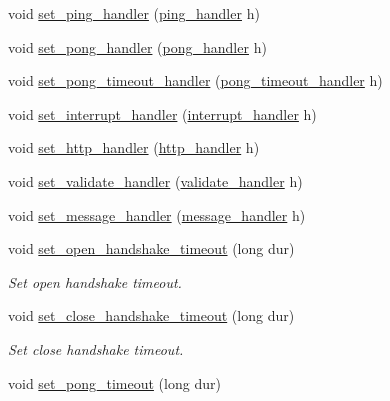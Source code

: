 \begin{DoxyCompactItemize}
\item 
void \hyperlink{classwebsocketpp_1_1endpoint_adc6caf0164a0cd073f0535078ccac123}{set\+\_\+ping\+\_\+handler} (\hyperlink{namespacewebsocketpp_a9dcaaa7370865f1bcacb55ae715793ef}{ping\+\_\+handler} h)
\item 
void \hyperlink{classwebsocketpp_1_1endpoint_a8ab51c3878bbbcfc92cf5ed6af65e8d7}{set\+\_\+pong\+\_\+handler} (\hyperlink{namespacewebsocketpp_a1798d54e6d98a481cf870091af84bc1f}{pong\+\_\+handler} h)
\item 
void \hyperlink{classwebsocketpp_1_1endpoint_a02f6288d1e7c32de7a5940a337076917}{set\+\_\+pong\+\_\+timeout\+\_\+handler} (\hyperlink{namespacewebsocketpp_a2c5925a111b9e553efebea35d5ea155f}{pong\+\_\+timeout\+\_\+handler} h)
\item 
void \hyperlink{classwebsocketpp_1_1endpoint_a026eb37f85cea8e79f1a007d12bb55dd}{set\+\_\+interrupt\+\_\+handler} (\hyperlink{namespacewebsocketpp_a55f6947df7673a9de3c44b6bd5d4a82a}{interrupt\+\_\+handler} h)
\item 
void \hyperlink{classwebsocketpp_1_1endpoint_a511874384b71238b042968cf736bc510}{set\+\_\+http\+\_\+handler} (\hyperlink{namespacewebsocketpp_a37bc4d5b3b21d3bb494d8a23236315d2}{http\+\_\+handler} h)
\item 
void \hyperlink{classwebsocketpp_1_1endpoint_ac5d059736dd862ccfb3582ba310dfae7}{set\+\_\+validate\+\_\+handler} (\hyperlink{namespacewebsocketpp_ae28f3fed86a59b1998746694f3d4edbd}{validate\+\_\+handler} h)
\item 
void \hyperlink{classwebsocketpp_1_1endpoint_a34a3a8351bff65ba878975be471cab85}{set\+\_\+message\+\_\+handler} (\hyperlink{classwebsocketpp_1_1endpoint_afa2109f793a8d8d90599ea339bbcd8e5}{message\+\_\+handler} h)
\item 
void \hyperlink{classwebsocketpp_1_1endpoint_adb8b3736e30bb8e5ee6add965a948102}{set\+\_\+open\+\_\+handshake\+\_\+timeout} (long dur)
\begin{DoxyCompactList}\small\item\em Set open handshake timeout. \end{DoxyCompactList}\item 
void \hyperlink{classwebsocketpp_1_1endpoint_a54caf799e1cf531d26f67999068d483b}{set\+\_\+close\+\_\+handshake\+\_\+timeout} (long dur)
\begin{DoxyCompactList}\small\item\em Set close handshake timeout. \end{DoxyCompactList}\item 
void \hyperlink{classwebsocketpp_1_1endpoint_abcb25dde6f71933c3dbe517c45ebe5c6}{set\+\_\+pong\+\_\+timeout} (long dur)

\end{DoxyCompactItemize}
